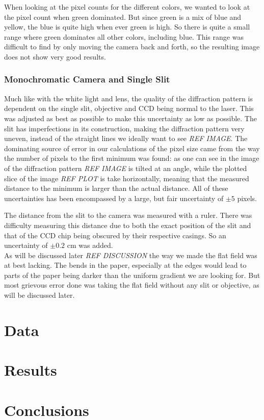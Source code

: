 \documentclass{emulateapj}
\begin{document}
When looking at the pixel counts for the different colors, we wanted to look at the pixel count when green dominated. But since green is a mix of blue and yellow, the blue is quite high when ever green is high. So there is quite a small range where green dominates all other colors, including blue. This range was difficult to find by only moving the camera back and forth, so the resulting image does not show very good results.

\subsubsection{Monochromatic Camera and Single Slit}

Much like with the white light and lens, the quality of the diffraction pattern is dependent on the single slit, objective and CCD being normal to the laser. This was adjusted as best as possible to make this uncertainty as low as possible.
The slit has imperfections in its construction, making the diffraction pattern very uneven, instead of the straight lines we ideally want to see \emph{REF IMAGE}.
The dominating source of error in our calculations of the pixel size came from the way the number of pixels to the first minimum was found: as one can see in the image of the diffraction pattern \emph{REF IMAGE} is tilted at an angle, while the plotted slice of the image \emph{REF PLOT} is take horizontally, meaning that the measured distance to the minimum is larger than the actual distance.
All of these uncertainties has been encompassed by a large, but fair uncertainty of $\pm 5$ pixels. 

The distance from the slit to the camera was measured with a ruler. There was difficulty measuring this distance due to both the exact position of the slit and that of the CCD chip being obscured by their respective casings. So an uncertainty of $\pm 0.2$ cm was added.\\

As will be discussed later \emph{REF DISCUSSION} the way we made the flat field was at best lacking. The bends in the paper, especially at the edges would lead to parts of the paper being darker than the uniform gradient we are looking for. But most grievous error done was taking the flat field without any slit or objective, as will be discussed later.




 

\section{Data}
\label{sec:data}



\section{Results}
\label{sec:results}

\section{Conclusions}
\label{sec:conclusions}
\end{document}
